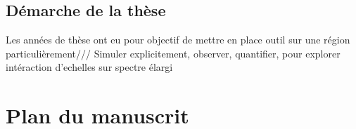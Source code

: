 \subsection{Démarche de la thèse}
Les années de thèse ont eu pour objectif de mettre en place outil sur une région particulièrement/// Simuler explicitement, observer, quantifier, pour explorer intéraction d'echelles sur spectre élargi


\section{Plan du manuscrit}












